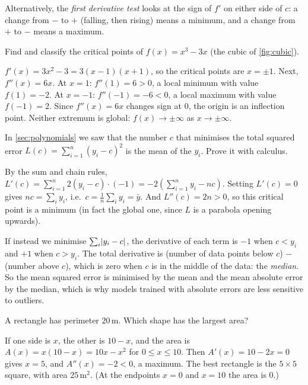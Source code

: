 Alternatively, the \emph{first derivative test} looks at the sign of $f'$ on
either side of $c$: a change from $-$ to $+$ (falling, then rising) means a
minimum, and a change from $+$ to $-$ means a maximum.

\begin{example}\label{ex:classify-critical}
Find and classify the critical points of $f(x) = x^3 - 3x$ (the cubic of
\cref{fig:cubic}).

\sol $f'(x) = 3x^2 - 3 = 3(x - 1)(x + 1)$, so the critical points are
$x = \pm1$. Next, $f''(x) = 6x$. At $x = 1$: $f''(1) = 6 > 0$, a local minimum
with value $f(1) = -2$. At $x = -1$: $f''(-1) = -6 < 0$, a local maximum with
value $f(-1) = 2$. Since $f''(x) = 6x$ changes sign at $0$, the origin is an
inflection point. Neither extremum is global: $f(x)\to\pm\infty$ as
$x\to\pm\infty$.
\end{example}

\begin{example}\label{ex:mean-minimises}
In \cref{sec:polynomials} we saw that the number $c$ that minimises the total
squared error $L(c) = \sum_{i=1}^n (y_i - c)^2$ is the mean of the $y_i$. Prove
it with calculus.

\sol By the sum and chain rules,
$L'(c) = \sum_{i=1}^n 2(y_i - c)\cdot(-1) = -2\left(\sum_{i=1}^n y_i - nc\right)$.
Setting $L'(c) = 0$ gives $nc = \sum_i y_i$, i.e.\ $c = \frac1n\sum_iy_i = \bar
y$. And $L''(c) = 2n > 0$, so this critical point is a minimum (in fact the
global one, since $L$ is a parabola opening upwards).
\end{example}

\begin{remark}
If instead we minimise $\sum_i\lvert y_i - c\rvert$, the derivative of each term is
$-1$ when $c < y_i$ and $+1$ when $c > y_i$. The total derivative is
(number of data points below $c$) $-$ (number above $c$), which is zero when
$c$ is in the middle of the data: the \emph{median}. So the mean squared error
is minimised by the mean and the mean absolute error by the median, which is
why models trained with absolute errors are less sensitive to outliers.
\end{remark}

\begin{example}
A rectangle has perimeter $20$\,m. Which shape has the largest area?

\sol If one side is $x$, the other is $10 - x$, and the area is
$A(x) = x(10 - x) = 10x - x^2$ for $0 \le x \le 10$. Then $A'(x) = 10 - 2x = 0$
gives $x = 5$, and $A''(x) = -2 < 0$, a maximum. The best rectangle is the
$5\times5$ square, with area $25$\,m$^2$. (At the endpoints $x = 0$ and
$x = 10$ the area is $0$.)
\end{example}


